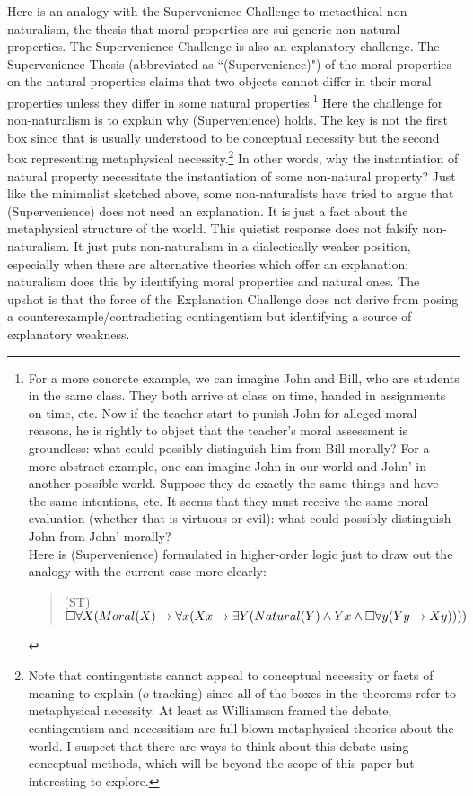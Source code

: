 Here is an analogy with the Supervenience Challenge to metaethical non-naturalism, the thesis that moral properties are sui generic non-natural properties. The Supervenience Challenge is also an explanatory challenge. The Supervenience Thesis (abbreviated as ``(Supervenience)") of the moral properties on the natural properties claims that two objects cannot differ in their moral properties unless they differ in some natural properties.\footnote{For a more concrete example, we can imagine John and Bill, who are students in the same class. They both arrive at class on time, handed in assignments on time, etc. Now if the teacher start to punish John for alleged moral reasons, he is rightly to object that the teacher's moral assessment is groundless: what could possibly distinguish him from Bill morally? For a more abstract example, one can imagine John in our world and John' in another possible world. Suppose they do exactly the same things and have the same intentions, etc. It seems that they must receive the same moral evaluation (whether that is virtuous or evil): what could possibly distinguish John from John' morally? \\
Here is (Supervenience) formulated in higher-order logic just to draw out the analogy with the current case more clearly: 
\begin{quote}
(ST) $\Box \forall X (Moral(X) \rightarrow \forall x (Xx \rightarrow \exists Y (Natural(Y) \wedge Yx \wedge \Box \forall y (Yy \rightarrow Xy))))$
\end{quote}} 
Here the challenge for non-naturalism is to explain why (Supervenience) holds. The key is not the first box since that is usually understood to be conceptual necessity but the second box representing metaphysical necessity.\footnote{Note that contingentists cannot appeal to conceptual necessity or facts of meaning to explain ($o$-tracking) since all of the boxes in the theorems refer to metaphysical necessity. At least as Williamson framed the debate, contingentism and necessitism are full-blown metaphysical theories about the world. I suspect that there are ways to think about this debate using conceptual methods, which will be beyond the scope of this paper but interesting to explore.}
In other words, why the instantiation of natural property necessitate the instantiation of some non-natural property? Just like the minimalist sketched above, some non-naturalists have tried to argue that (Supervenience) does not need an explanation. It is just a fact about the metaphysical structure of the world. This quietist response does not falsify non-naturalism. It just puts non-naturalism in a dialectically weaker position, especially when there are alternative theories which offer an explanation: naturalism does this by identifying moral properties and natural ones. 
The upshot is that the force of the Explanation Challenge does not derive from posing a counterexample/contradicting contingentism but identifying a source of explanatory weakness.
 
